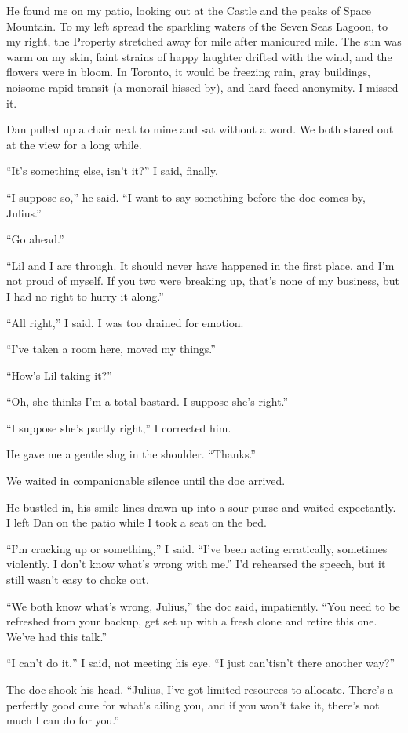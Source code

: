 He found me on my patio, looking out at the Castle and the peaks of
Space Mountain. To my left spread the sparkling waters of the Seven
Seas Lagoon, to my right, the Property stretched away for mile
after manicured mile. The sun was warm on my skin, faint strains of
happy laughter drifted with the wind, and the flowers were in
bloom. In Toronto, it would be freezing rain, gray buildings,
noisome rapid transit (a monorail hissed by), and hard-faced
anonymity. I missed it.

Dan pulled up a chair next to mine and sat without a word. We both
stared out at the view for a long while.

“It's something else, isn't it?” I said, finally.

“I suppose so,” he said. “I want to say something before the doc
comes by, Julius.”

“Go ahead.”

“Lil and I are through. It should never have happened in the first
place, and I'm not proud of myself. If you two were breaking up,
that's none of my business, but I had no right to hurry it along.”

“All right,” I said. I was too drained for emotion.

“I've taken a room here, moved my things.”

“How's Lil taking it?”

“Oh, she thinks I'm a total bastard. I suppose she's right.”

“I suppose she's partly right,” I corrected him.

He gave me a gentle slug in the shoulder. “Thanks.”

We waited in companionable silence until the doc arrived.

He bustled in, his smile lines drawn up into a sour purse and
waited expectantly. I left Dan on the patio while I took a seat on
the bed.

“I'm cracking up or something,” I said. “I've been acting
erratically, sometimes violently. I don't know what's wrong with
me.” I'd rehearsed the speech, but it still wasn't easy to choke
out.

“We both know what's wrong, Julius,” the doc said, impatiently.
“You need to be refreshed from your backup, get set up with a fresh
clone and retire this one. We've had this talk.”

“I can't do it,” I said, not meeting his eye. “I just can't{\dash}isn't
there another way?”

The doc shook his head. “Julius, I've got limited resources to
allocate. There's a perfectly good cure for what's ailing you, and
if you won't take it, there's not much I can do for you.”

